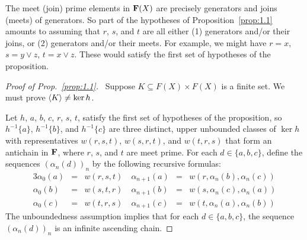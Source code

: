 \begin{remarks}
  The meet (join) prime elements in $\mathbf{F}(X)$ are precisely generators and joins 
  (meets) of generators. So part of the hypotheses of Proposition~\ref{prop:1.1} 
  amounts to assuming that $r$, $s$, and $t$ are all either (1) generators and/or 
  their joins, or (2) generators 
  and/or their meets.  For example, we might have $r = x$, $s = y \vee z$, $t = x \vee z$.
  These would satisfy the first set of hypotheses of the proposition.
\end{remarks}
\begin{proof}[Proof of Prop.~\ref{prop:1.1}]\
Suppose $K \subseteq F(X) \times F(X)$ is a finite set. 
We must prove $\langle K\rangle \neq \ker h$.

\medskip
{}
  Let $h$, $a$, $b$, $c$, $r$, $s$, $t$, satisfy the first set of hypotheses of the 
proposition, so $h^{-1}\{a\}$, $h^{-1}\{b\}$, and $h^{-1}\{c\}$ are three distinct, 
upper unbounded classes of $\ker h$ with representatives $w(r,s,t)$, $w(s,r,t)$, and 
$w(t,r,s)$ that form an antichain in $\mathbf{F}$, where $r$, $s$, and $t$ are meet 
prime.
For each $d\in \{a, b, c\}$, define the sequences $(\alpha_n(d))_n$
by the following recursive formulas:
\begin{alignat*}{3}
  \alpha_0(a)     &= & w(r,s,t) \quad 
  \alpha_{n+1}(a) &= & w(r,\alpha_n(b),\alpha_n(c))\\
  \alpha_0(b)     &= & w(s,t,r)\quad 
  \alpha_{n+1}(b) &= & w(s,\alpha_n(c),\alpha_n(a))\\
  \alpha_0(c)     &= & w(t,r,s)\quad  
  \alpha_{n+1}(c) &= & w(t,\alpha_n(a),\alpha_n(b))
\end{alignat*}
The unboundedness assumption implies that for each 
$d \in \{a,b,c\}$, the sequence $(\alpha_n(d))_n$ is
an infinite ascending chain.


\end{proof}
